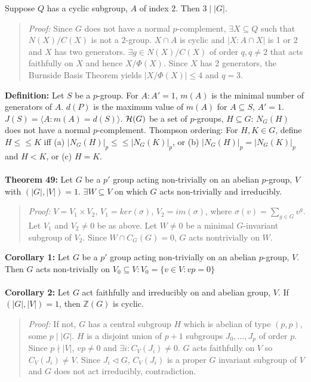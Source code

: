 Suppose $Q$ has a cyclic subgroup,
$A$ of index $2$.  Then $ 3 \mid |G|$.
\begin{quote}
\emph{Proof:}
Since $G$ does not have a normal $p$-complement, $\exists X \subseteq Q$ such that $N(X)/C(X)$ is not a
$2$-group. $X \cap A$ is cyclic and $|X: A \cap X|$ is 1 or 2 and $X$ has two generators.
$\exists g \in N(X)/C(X)$ of order
$q, q \neq 2$ that acts faithfully on $X$ and hence $X/\Phi(X)$.  Since $X$ has 2 generators, the Burnside
Basis Theorem yields $|X/\Phi(X)| \leq 4$ and $q = 3$.
\end{quote}
{\bf Definition:} Let $S$ be a  $p$-group.  For $A: A' = 1$, $m(A)$ is the minimal number of generators of $A$.
$d(P)$ is the maximum value of $m(A)$ for $A \subseteq S$, 
$A' = 1$. $J(S) = \langle A: m(A) = d(S) \rangle$.
${\cal H}(G)$ be a set of $p$-groups, $H \subseteq G$: $N_G(H)$ does not have a normal $p$-complement.  
Thompson ordering: For $H, K \in G$, define $H \leq \leq K$ iff 
(a) $|N_G(H)|_p \leq \leq |N_G(K)|_p$, or
(b) $|N_G(H)|_p = |N_G(K)|_p$ and $H < K$, or
(c) $H = K$.
\\
\\
{\bf Theorem 49:}   Let $G$ be a $p'$ group acting non-trivially on an abelian $p$-group, $V$ with
$(|G|, |V|) =1$.  $\exists W \subseteq V$ on which $G$ acts non-trivially and irreducibly.
\begin{quote}
\emph{Proof:}
$V = V_1 \times V_2$, $V_1 = ker(\sigma)$, $V_2 = im(\sigma)$, where
$\sigma(v)= \sum_{g \in G} v^g$.
Let $V_1$ and $V_2 \neq 0$ be as above.  Let $W \neq 0$ be a minimal $G$-invariant
subgroup of $V_2$.  Since $W \cap C_G(G) = 0$, $G$ acts nontrivially on $W$.
\end{quote}
{\bf Corollary 1:}   Let $G$ be a $p'$ group acting non-trivially on an abelian $p$-group, $V$.
Then $G$ acts non-trivially on $V_0 \subseteq V: V_0 = \{ v \in V: vp = 0 \}$
\\
\\
{\bf Corollary 2:}   Let $G$ act faithfully and irreducibly on and abelian group, $V$.
If $(|G|, |V|) =1$, then ${\mathbb Z}(G)$ is cyclic.
\begin{quote}
\emph{Proof:}
If not, $G$  has a central subgroup $H$ which is abelian of type $(p, p)$, some $p \mid |G|$.
$H$ is a disjoint union of $p+1$ subgroups $J_0, \ldots, J_p$ of order $p$. Since $p \nmid |V|$,
$vp \neq 0$ and $\exists i: C_V(J_i) \neq 0$.  $G$ acts faithfully on $V$ so $C_V(J_i) \neq V$.
Since $J_i \lhd G$, $C_V(J_i)$ is a proper $G$ invariant subgroup of $V$ and $G$ does not act irreducibly,
contradiction.
\end{quote}
